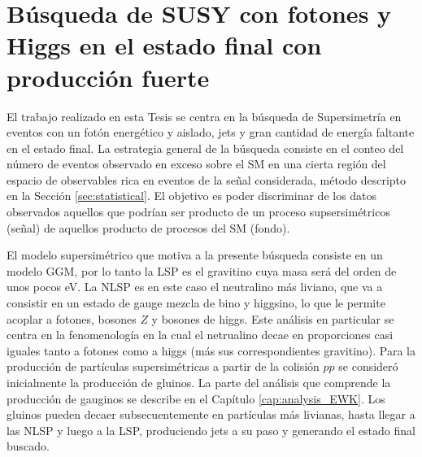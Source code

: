 \chapter{Búsqueda de SUSY con fotones y Higgs en el estado final con producción fuerte}




El trabajo realizado en esta Tesis se centra en la búsqueda de Supersimetría en eventos con un fotón energético y aislado, jets y gran cantidad de energía faltante en el estado final. La estrategia general de la búsqueda consiste en el conteo del número de eventos observado en exceso sobre el SM en una cierta región del espacio de observables rica en eventos de la señal considerada, método descripto en la Sección \ref{sec:statistical}. El objetivo es poder discriminar de los datos observados aquellos que podrían ser producto de un proceso supsersimétricos (señal) de aquellos producto de procesos del SM (fondo).


El modelo supersimétrico que motiva a la presente búsqueda consiste en un modelo GGM, por lo tanto la LSP es el gravitino cuya masa será del orden de unos pocos eV. La NLSP es en este caso el neutralino más liviano, que va a consistir en un estado de gauge mezcla de bino y higgsino, lo que le permite acoplar a fotones, bosones $Z$ y bosones de higgs. Este análisis en particular se centra en la fenomenología en la cual el netrualino decae en proporciones casi iguales tanto a fotones como a higgs (más sus correspondientes gravitino). Para la producción de partículas supersimétricas a partir de la colisión $pp$ se consideró inicialmente la producción de gluinos. La parte del análisis que comprende la producción de gauginos se describe en el Capítulo \ref{cap:analysis_EWK}. Los gluinos pueden decaer subsecuentemente en partículas más livianas, hasta llegar a las NLSP y luego a la LSP, produciendo jets a su paso y generando el estado final buscado.

